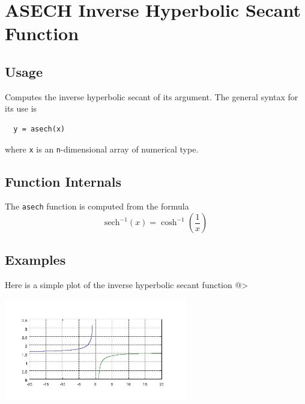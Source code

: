 \section{ASECH Inverse Hyperbolic Secant Function}

\subsection{Usage}

Computes the inverse hyperbolic secant of its argument.  The general
syntax for its use is
\begin{verbatim}
  y = asech(x)
\end{verbatim}
where \verb|x| is an \verb|n|-dimensional array of numerical type.
\subsection{Function Internals}

The \verb|asech| function is computed from the formula
\[
   \mathrm{sech}^{-1}(x) = \cosh^{-1}\left(\frac{1}{x}\right)
\]
\subsection{Examples}

Here is a simple plot of the inverse hyperbolic secant function
@>


\centerline{\includegraphics[width=8cm]{asechplot}}


